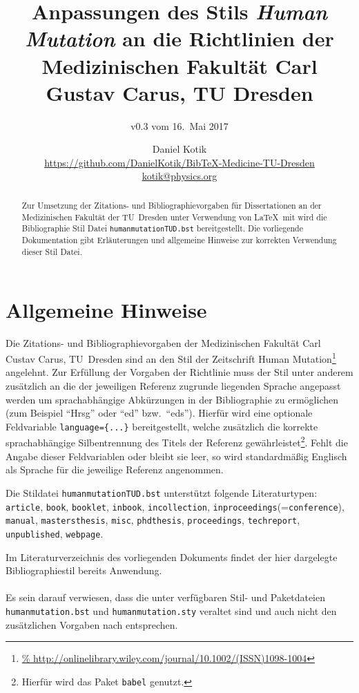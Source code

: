 \documentclass[a4paper,10pt]{scrartcl}
\title{Anpassungen des Stils \emph{Human Mutation} an die
Richtlinien der Medizinischen Fakultät Carl Gustav Carus, TU Dresden}
\subtitle{v0.3 vom 16.~Mai 2017}
\author{Daniel Kotik\\
\large\url{https://github.com/DanielKotik/BibTeX-Medicine-TU-Dresden}\\
\large\url{kotik@physics.org}}
\date{}
\renewcommand{\cite}{\citep}  %
\begin{document}
\setlength{\parindent}{0em}
\maketitle

\begin{abstract}
Zur Umsetzung der Zitations- und Bibliographievorgaben für Dissertationen an
der Medizinischen Fakultät der TU~Dresden unter Verwendung von \LaTeX\ mit
 wird die Bibliographie Stil Datei
\verb|humanmutationTUD.bst| bereitgestellt. Die vorliegende Dokumentation gibt
Erläuterungen und allgemeine Hinweise zur korrekten Verwendung dieser Stil
Datei.
\end{abstract}

\section{Allgemeine Hinweise}
Die Zitations- und Bibliographievorgaben \cite{ZitiervorgabenCGC} der
Medizinischen Fakultät Carl Custav
Carus, TU~Dresden sind an den Stil der Zeitschrift Human
Mutation\footnote{\url{%
http://onlinelibrary.wiley.com/journal/10.1002/(ISSN)1098-1004}} angelehnt.
Zur Erfüllung der Vorgaben der Richtlinie muss der Stil unter anderem zusätzlich
an die der jeweiligen Referenz zugrunde liegenden Sprache angepasst werden um
sprachabhängige Abkürzungen in der Bibliographie zu ermöglichen (zum Beispiel
"`Hrsg"' oder "`ed"' bzw.\ "`eds"').
Hierfür wird eine optionale Feldvariable \verb|language={...}|
bereitgestellt, welche zusätzlich die korrekte sprachabhängige Silbentrennung
des Titels der Referenz gewährleistet\footnote{Hierfür wird das Paket
\verb|babel| genutzt.}. Fehlt die Angabe dieser Feldvariablen oder bleibt sie
leer, so wird standardmä{\ss}ig Englisch als Sprache für die jeweilige Referenz
angenommen.

Die Stildatei \verb|humanmutationTUD.bst| unterstützt folgende Literaturtypen:
\verb|article|, \verb|book|, \verb|booklet|, \verb|inbook|,
\verb|incollection|, \verb|inproceedings|(=\verb|conference|), \verb|manual|,
\verb|mastersthesis|, \verb|misc|, \verb|phdthesis|, \verb|proceedings|,
\verb|techreport|, \verb|unpublished|, \verb|webpage|.


Im Literaturverzeichnis des vorliegenden
Dokuments findet der hier
dargelegte Bibliographiestil bereits Anwendung. \\\\
Es sein darauf verwiesen, dass die unter \cite{humanmutationSchneider}
verfügbaren Stil- und Paketdateien \verb|humanmutation.bst| und
\verb|humanmutation.sty| veraltet sind und auch nicht den zusätzlichen Vorgaben
nach \cite{ZitiervorgabenCGC} entsprechen.
\end{document}
